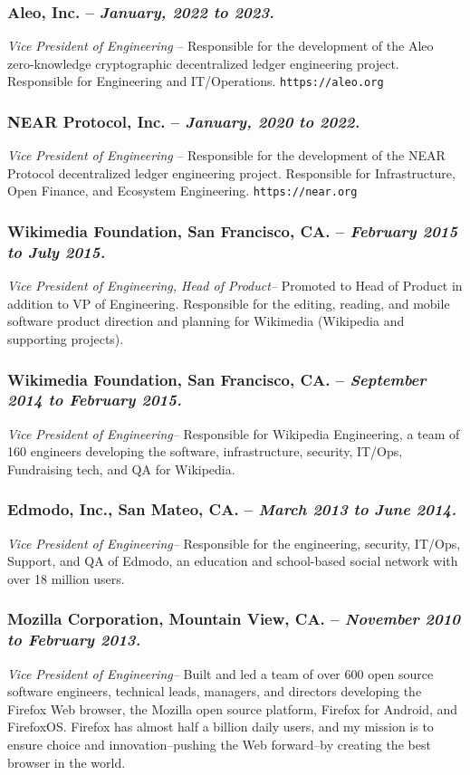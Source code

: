 \documentclass[10pt]{report}
\begin{document}
\subsubsection*{Aleo, Inc. -- \emph{January, 2022 to 2023. }} \emph{Vice
President of Engineering} -- Responsible for the development of the Aleo
zero-knowledge cryptographic decentralized ledger engineering project.
Responsible for Engineering and IT/Operations.  \texttt{https://aleo.org}

\subsubsection*{NEAR Protocol, Inc. -- \emph{January, 2020 to 2022. }}
\emph{Vice President of Engineering} -- Responsible for the development of the
NEAR Protocol decentralized ledger engineering project. Responsible for
Infrastructure, Open Finance, and Ecosystem Engineering.
\texttt{https://near.org}

\subsubsection*{Wikimedia Foundation, San Francisco, CA. -- \emph{February 2015
to July 2015. }} \emph{Vice President of Engineering, Head of Product--}
Promoted to Head of Product in addition to VP of Engineering.  Responsible for
the editing, reading, and mobile software product direction and planning for
Wikimedia (Wikipedia and supporting projects).

\subsubsection*{Wikimedia Foundation, San Francisco, CA. -- \emph{September
2014 to February 2015. }} \emph{Vice President of Engineering--} Responsible
for Wikipedia Engineering, a team of 160 engineers developing the software,
infrastructure, security, IT/Ops, Fundraising tech, and QA for Wikipedia.

\subsubsection*{Edmodo, Inc., San Mateo, CA. -- \emph{March 2013 to June 2014.
}} \emph{Vice President of Engineering--} Responsible for the engineering,
security, IT/Ops, Support, and QA of Edmodo, an education and school-based
social network with over 18 million users.

\subsubsection*{Mozilla Corporation, Mountain View, CA. -- \emph{November 2010
to February 2013. }} \emph{Vice President of Engineering--} Built and led a
team of over 600 open source software engineers, technical leads, managers, and
directors developing the Firefox Web browser, the Mozilla open source platform,
Firefox for Android, and FirefoxOS.  Firefox has almost half a billion daily
users, and my mission is to ensure choice and innovation--pushing the Web
forward--by creating the best browser in the world.
\end{document}
